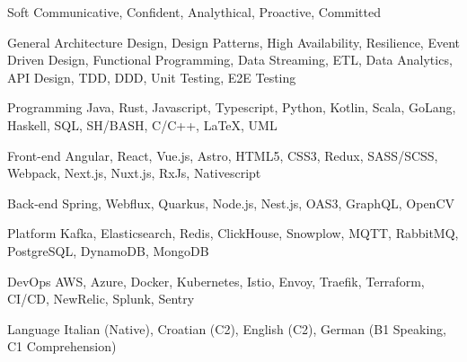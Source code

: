 
\begin{cvskills}

  \cvskill
    {Soft} %
    {Communicative, Confident, Analythical, Proactive, Committed} %

  \cvskill
    {General} %
    {Architecture Design, Design Patterns, High Availability, Resilience, Event Driven Design, Functional Programming,\newline
    Data Streaming, ETL, Data Analytics, API Design, TDD, DDD, Unit Testing, E2E Testing} %

  \cvskill
    {Programming} %
    {Java, Rust, Javascript, Typescript, Python, Kotlin, Scala, GoLang, Haskell, SQL, SH/BASH, C/C++, LaTeX, UML} %

  \cvskill
    {Front-end} %
    {Angular, React, Vue.js, Astro, HTML5, CSS3, Redux, SASS/SCSS, Webpack, Next.js, Nuxt.js, RxJs, Nativescript} %
    
  \cvskill
    {Back-end} %
    {Spring, Webflux, Quarkus, Node.js, Nest.js, OAS3, GraphQL, OpenCV} %

  \cvskill
    {Platform} %
    {Kafka, Elasticsearch, Redis, ClickHouse, Snowplow, MQTT, RabbitMQ, PostgreSQL, DynamoDB, MongoDB} %

  \cvskill
    {DevOps} %
    {AWS, Azure, Docker, Kubernetes, Istio, Envoy, Traefik, Terraform, CI/CD, NewRelic, Splunk, Sentry} %

  \cvskill
    {Language} %
    {Italian (Native), Croatian (C2), English (C2), German (B1 Speaking, C1 Comprehension)} %

\end{cvskills}
